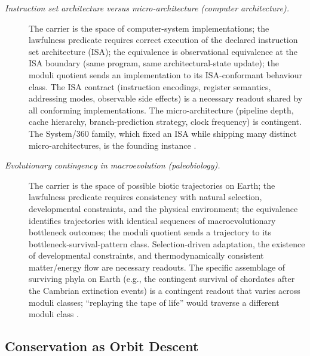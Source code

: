 \documentclass[11pt]{article}
\theoremstyle{definition}
\begin{document}
\begin{description}
\item[\emph{Instruction set architecture versus
micro-architecture (computer architecture).}]
The carrier is the space of computer-system
implementations; the lawfulness predicate requires
correct execution of the declared instruction set
architecture (ISA); the equivalence is observational
equivalence at the ISA boundary (same program, same
architectural-state update); the moduli quotient sends
an implementation to its ISA-conformant behaviour
class.  The ISA contract (instruction encodings,
register semantics, addressing modes, observable side
effects) is a necessary readout shared by all
conforming implementations.  The micro-architecture
(pipeline depth, cache hierarchy, branch-prediction
strategy, clock frequency) is contingent.  The
System/360 family, which fixed an ISA while shipping
many distinct micro-architectures, is the founding
instance \citep{AmdahlBlaauwBrooks1964System360}.

\item[\emph{Evolutionary contingency in macroevolution
(paleobiology).}]
The carrier is the space of possible biotic
trajectories on Earth; the lawfulness predicate
requires consistency with natural selection,
developmental constraints, and the physical
environment; the equivalence identifies trajectories
with identical sequences of macroevolutionary
bottleneck outcomes; the moduli quotient sends a
trajectory to its bottleneck-survival-pattern class.
Selection-driven adaptation, the existence of
developmental constraints, and thermodynamically
consistent matter/energy flow are necessary readouts.
The specific assemblage of surviving phyla on Earth
(e.g., the contingent survival of chordates after the
Cambrian extinction events) is a contingent readout
that varies across moduli classes; ``replaying the
tape of life'' would traverse a different moduli class
\citep{Gould1989WonderfulLife}.
\end{description}

\subsection{Conservation as Orbit Descent}\label{sec:status-records-coherence:conservation}
\end{document}

